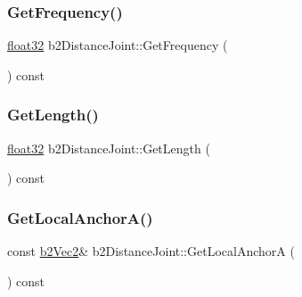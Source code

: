 \mbox{\label{classb2_distance_joint_a9f7bfb48940bbc8dbef27600e327a739}} 
\subsubsection{\texorpdfstring{GetFrequency()}{GetFrequency()}}
{\footnotesize\ttfamily \mbox{\hyperlink{b2_settings_8h_aacdc525d6f7bddb3ae95d5c311bd06a1}{float32}} b2\+Distance\+Joint\+::\+Get\+Frequency (\begin{DoxyParamCaption}{ }\end{DoxyParamCaption}) const\hspace{0.3cm}{\ttfamily [inline]}}

\mbox{\label{classb2_distance_joint_a7a4d8845e54abb6f8695ff6b3c78f9f9}} 
\subsubsection{\texorpdfstring{GetLength()}{GetLength()}}
{\footnotesize\ttfamily \mbox{\hyperlink{b2_settings_8h_aacdc525d6f7bddb3ae95d5c311bd06a1}{float32}} b2\+Distance\+Joint\+::\+Get\+Length (\begin{DoxyParamCaption}{ }\end{DoxyParamCaption}) const\hspace{0.3cm}{\ttfamily [inline]}}

\mbox{\label{classb2_distance_joint_aaa881128071c62f21898a75d5b20308a}} 
\subsubsection{\texorpdfstring{GetLocalAnchorA()}{GetLocalAnchorA()}}
{\footnotesize\ttfamily const \mbox{\hyperlink{structb2_vec2}{b2\+Vec2}}\& b2\+Distance\+Joint\+::\+Get\+Local\+AnchorA (\begin{DoxyParamCaption}{ }\end{DoxyParamCaption}) const\hspace{0.3cm}{\ttfamily [inline]}}



